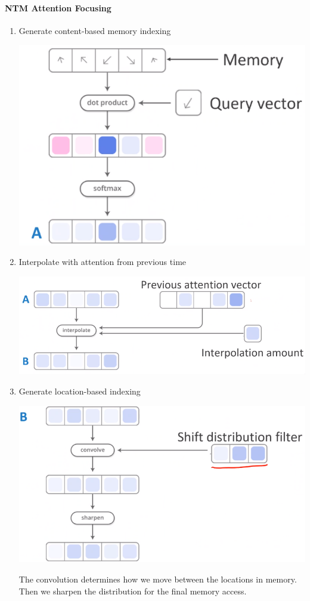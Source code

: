 \documentclass[10pt]{report}
\begin{document}
\paragraph{NTM Attention Focusing}

\begin{enumerate}
	\item Generate content-based memory indexing
	\begin{center}
		\includegraphics[scale=0.33]{135.png}
	\end{center}
	\item Interpolate with attention from previous time
	\begin{center}
		\includegraphics[scale=0.33]{136.png}
	\end{center}
	\item Generate location-based indexing
	\begin{center}
		\includegraphics[scale=0.33]{137.png}
	\end{center}
	The convolution determines how we move between the locations in memory.\\Then we sharpen the distribution for the final memory access.
\end{enumerate}
\end{document}
